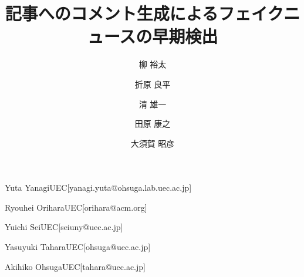 \documentclass[submit,techrep,noauthor]{ipsj}
\begin{document}
\title{記事へのコメント生成によるフェイクニュースの早期検出}


\author{柳 裕太}{Yuta Yanagi}{UEC}[yanagi.yuta@ohsuga.lab.uec.ac.jp]
\author{折原 良平}{Ryouhei Orihara}{UEC}[orihara@acm.org]
\author{清 雄一}{Yuichi Sei}{UEC}[seiuny@uec.ac.jp]
\author{田原 康之}{Yasuyuki Tahara}{UEC}[ohsuga@uec.ac.jp]
\author{大須賀 昭彦}{Akihiko Ohsuga}{UEC}[tahara@uec.ac.jp]



%
%
%

\maketitle



%











\end{document}
